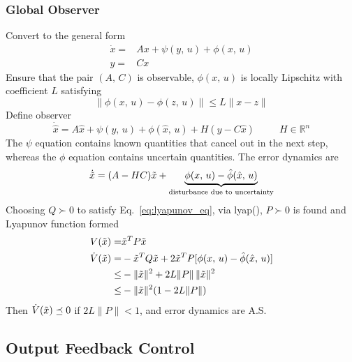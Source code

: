 \documentclass[twocolumn]{article}    %
\begin{document}
\subsubsection*{Global Observer}
Convert to the general form
\begin{align*}
    \dot{x} =& Ax + \psi(y,\,u) + \phi(x,\,u)\\
    y =&Cx
\end{align*}
Ensure that the pair \((A,\,C)\) is observable, \(\phi(x,\,u)\) is locally Lipschitz with coefficient \(L\) satisfying
\begin{equation*}
    \|\phi(x,\,u) - \phi(z,\,u)\| \leq L \|x-z\|
\end{equation*}
Define observer 
\begin{equation*}
    \dot{\hat{x}} = A\hat{x} + \psi(y,\,u) + \phi(\hat{x},\,u) + H(y-C\hat{x}) \hspace{30pt} H\in\mathds{R}^n
\end{equation*}
The \(\psi\) equation contains known quantities that cancel out in the next step, whereas the \(\phi\) equation contains uncertain quantities. The error dynamics are
\begin{equation*}
    \dot{\Tilde{x}} = (A-HC) \Tilde{x} + \underbrace{\phi(x,\,u) - \hat{\phi}(\hat{x},\,u)}_{\text{disturbance due to uncertainty}}
\end{equation*}
Choosing \(Q\succ0\) to satisfy Eq.~\eqref{eq:lyapunov_eq}, via lyap(), \(P\succ0\) is found and Lyapunov function formed
\begin{align*}
    V(\Tilde{x}) =& \Tilde{x}^TP\Tilde{x}\\
    \dot{V}(\Tilde{x})=&  -\Tilde{x}^TQ\Tilde{x} + 2\Tilde{x}^TP[\phi(x,\,u) - \hat{\phi}(\hat{x},\,u)]\\
    \leq& -\|\Tilde{x}\|^2 + 2L\|P\|\, \|\Tilde{x}\|^2\\
    \leq& -\|\Tilde{x}\|^2 (1-2L\|P\|)
\end{align*}
Then \(\dot{V}(\Tilde{x}) \preceq 0\) if \(2L\|P\| <1\), and error dynamics are A.S.



\subsection*{Output Feedback Control}
\end{document}
